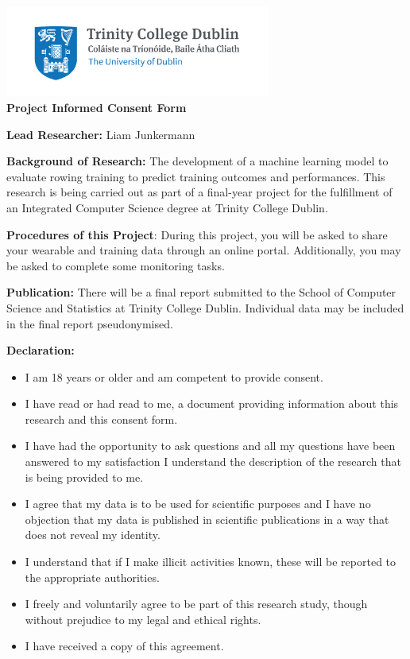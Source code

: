 \begin{center}
    \includegraphics[height=3cm]{info-sheet/Trinity_RGB_transparent_main.png}\\
    {\large\textbf{Project Informed Consent Form}}
\end{center}
\vspace{1cm}

\textbf{Lead Researcher:} Liam Junkermann

\textbf{Background of Research:} The development of a machine learning model to evaluate rowing training to predict training outcomes and performances. This research is being carried out as part of a final-year project for the fulfillment of an Integrated Computer Science degree at Trinity College Dublin.

\textbf{Procedures of this Project}: During this project, you will be asked to share your wearable and training data through an online portal. Additionally, you may be asked to complete some monitoring tasks.

\textbf{Publication:} There will be a final report submitted to the School of Computer Science and Statistics at Trinity College Dublin. Individual data may be included in the final report pseudonymised.

\textbf{Declaration:}
\begin{itemize}
    \item I am 18 years or older and am competent to provide consent.
    \item I have read or had read to me, a document providing information about this research and this consent form.
    \item I have had the opportunity to ask questions and all my questions have been answered to my satisfaction I understand the description of the research that is being provided to me.
    \item I agree that my data is to be used for scientific purposes and I have no objection that my data is published in scientific publications in a way that does not reveal my identity.
    \item I understand that if I make illicit activities known, these will be reported to the appropriate authorities.
    \item I freely and voluntarily agree to be part of this research study, though without prejudice to my legal and ethical rights.
    \item I have received a copy of this agreement.
\end{itemize}

